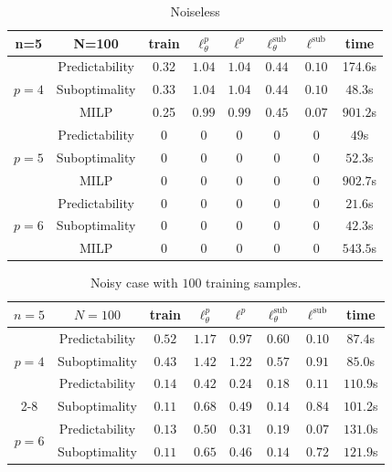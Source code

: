 \documentclass{article}
\theoremstyle{plain}
\begin{document}
\begin{table}[h!]
\caption{Noiseless}\label{tab:multicol:bilinear:noiseless}
\begin{center}
\small{
\begin{tabular}{|c|c|c|c|c|c|c|c|}
    \hline
   n=5 & N=100 & train &$\ell_\theta^p$ & $\ell^p$ &  $\ell_\theta^\text{sub}$ &  $\ell^\text{sub}$& time \\
    \hline
    \multirow{3}{*}{$p=4$}& Predictability & 0.32 & $1.04$ & $1.04$ & $0.44$ & $0.10$ & 174.6s\\
       \cline{2-8}
       & Suboptimality & 0.33 & $1.04$ & $1.04$ & $0.44$ & $0.10$ & $48.3$s\\
       \cline{2-8}
       & MILP & 0.25 & $0.99$ & $0.99$ & $0.45$ & $0.07$ & $901.2$s\\
    \hline
    \hline
    \multirow{3}{*}{$p=5$}& Predictability & 0 &  $0$ & $0$ & $0$ & $0$ & $49$s\\
       \cline{2-8}
       & Suboptimality & 0 & $0$ & $0$ & $0$ & $0$ & $52.3$s\\
       \cline{2-8}
       & MILP & 0 &  $0$ & $0$ & $0$ & $0$ & $902.7$s\\
    \hline
    \hline
    \multirow{3}{*}{$p=6$}& Predictability & 0&  $0$ & $0$ & $0$ & $0$ & $21.6$s\\
    \cline{2-8}
       &Suboptimality & 0& $0$ & $0$ & $0$ & $0$ & $42.3$s\\
       \cline{2-8}
       &MILP & 0&  $0$ & $0$ & $0$ & $0$ & $543.5$s\\
    \hline
\end{tabular}}
\end{center}
\vskip -0.1in
\end{table}

\begin{table}[h!]
\caption{Noisy case with $100$ training samples.}\label{tab:multicol:bilinear:noise100}
\small{
\begin{center}
\begin{tabular}{|c|c|c|c|c|c|c|c|}
    \hline
   $n=5$ & $N=100$ & train &$\ell_\theta^p$ & $\ell^p$ &  $\ell_\theta^\text{sub}$ &  $\ell^\text{sub}$ & time \\
    \hline
    \multirow{3}{*}{$p=4$}& Predictability & $0.52$ & $1.17$ & $0.97$ & $0.60$ & $0.10$ & $87.4$s\\
       \cline{2-8}
       & Suboptimality & $0.43$ & $1.42$ & $1.22$ & $0.57$ & $0.91$ & $85.0$s\\
    \hline
    \hline
    \multirow{3}{*}{$p=5$}& Predictability & $0.14$ &  $0.42$ & $0.24$ & $0.18$ & $0.11$ & $110.9$s\\
       \cline{2-8}
       & Suboptimality & $0.11$ & $0.68$ & $0.49$ & $0.14$ & $0.84$ & $101.2$s\\
    \hline
    \hline
    \multirow{3}{*}{$p=6$}& Predictability & $0.13$ &  $0.50$ & $0.31$ & $0.19$ & $0.07$ & $131.0$s\\
    \cline{2-8}
       &Suboptimality & $0.11$ & $0.65$ & $0.46$ & $0.14$ & $0.72$ & $121.9$s\\
    \hline
\end{tabular}
\end{center}}
\vskip -0.1in
\end{table}
\end{document}
